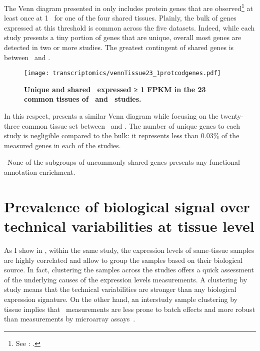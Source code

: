 The Venn diagram presented in  only includes protein
genes that are observed\footnote{See
: .}
at least once at 1 \FPKM\ for one of the four shared tissues.
Plainly, the bulk of genes expressed at this threshold is common
across the five datasets.
Indeed, while each study presents a tiny portion of genes
that are unique,
overall most genes are detected in two or more studies.
The greatest contingent of shared genes is between \uhlen\ and \gtex.

\begin{figure}[h]
    \texttt{[image: transcriptomics/vennTissue23\_1protcodgenes.pdf]}\centering
    \caption[Unique and shared \pcgs\ expressed
    in the 23 common tissues (≥1 \FPKM)]%
    {\label{fig:ExpGenePcoding1_t23}\textbf{Unique
    and shared \pcgs\ expressed ≥ 1 FPKM in the 23 common tissues
    of \uhlen\ and \gtex\ studies.}}
\end{figure}

In this respect,  presents a similar Venn diagram
while focusing on the twenty-three common tissue set between \uhlen\ and \gtex.
The number of unique genes to each study is negligible compared to the bulk:
it represents less than 0.03\% of the measured genes in each of the studies.
\begin{comment}
    Gtex:   462/17551 hence 0.02632329\%
    Uhlen:  281/17551 hence 0.01601048\%
\end{comment}

\NB\ None of the subgroups of uncommonly shared genes presents any functional
annotation enrichment.

\section{Prevalence of biological signal over technical variabilities at
tissue level}
\label{sec:Trans_ReproExpresTissue}

As I show in , within the same study,
the expression levels of same-tissue samples are highly correlated and
allow to group the samples based on their biological source.
In fact, clustering the samples across the studies offers a quick assessment of
the underlying causes of the expression levels measurements.
A clustering by study means that the technical variabilities are stronger
than any biological expression signature.
On the other hand,
an interstudy sample clustering by tissue implies that \Rnaseq\ measurements
are less prone to batch effects and more robust than measurements by
microarray assays~.

